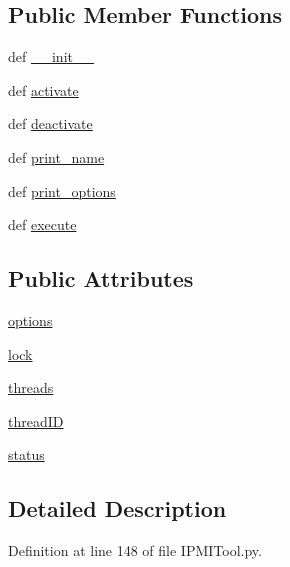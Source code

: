 \subsection*{Public Member Functions}
\begin{DoxyCompactItemize}
\item 
def \hyperlink{class_i_p_m_i_tool_1_1_i_p_m_i_tool_a5de40b2861cf82d75b68d65a00f56fd7}{\-\_\-\-\_\-init\-\_\-\-\_\-}
\item 
def \hyperlink{class_i_p_m_i_tool_1_1_i_p_m_i_tool_a7033e64733a6165c392c71159c75405c}{activate}
\item 
def \hyperlink{class_i_p_m_i_tool_1_1_i_p_m_i_tool_a7639dc29d494f89f9cd00c164984a014}{deactivate}
\item 
def \hyperlink{class_i_p_m_i_tool_1_1_i_p_m_i_tool_ad99bf0f2639b3f838e1c94efd64e24ad}{print\-\_\-name}
\item 
def \hyperlink{class_i_p_m_i_tool_1_1_i_p_m_i_tool_a40df31a86acffb30ca43ab938bd936ab}{print\-\_\-options}
\item 
def \hyperlink{class_i_p_m_i_tool_1_1_i_p_m_i_tool_a308c802b6dcf01604da2538f72cb2126}{execute}
\end{DoxyCompactItemize}
\subsection*{Public Attributes}
\begin{DoxyCompactItemize}
\item 
\hyperlink{class_i_p_m_i_tool_1_1_i_p_m_i_tool_a9f0f9484b1b8f6a0df8338f7894c8823}{options}
\item 
\hyperlink{class_i_p_m_i_tool_1_1_i_p_m_i_tool_a36a9429fca7200e0a6d1d78002b95d11}{lock}
\item 
\hyperlink{class_i_p_m_i_tool_1_1_i_p_m_i_tool_a2f6ca8b0b509ba2c514b72312841b2d6}{threads}
\item 
\hyperlink{class_i_p_m_i_tool_1_1_i_p_m_i_tool_aaa15d2dc90d9e3a45adc4519912c811d}{thread\-I\-D}
\item 
\hyperlink{class_i_p_m_i_tool_1_1_i_p_m_i_tool_a4dba85133ceca9edff481c575cb468d9}{status}
\end{DoxyCompactItemize}


\subsection{Detailed Description}


Definition at line 148 of file I\-P\-M\-I\-Tool.\-py.



